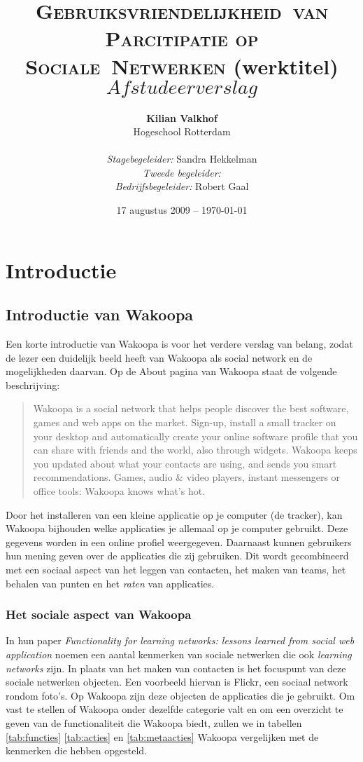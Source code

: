 \documentclass[a4paper, 10pt, pdftex]{article}
\title{\textsc{Gebruiksvriendelijkheid~van Parcitipatie op Sociale~Netwerken} \linebreak (werktitel) \linebreak $Afstudeerverslag$}
\author{\textbf{Kilian Valkhof}\\
  Hogeschool Rotterdam\\
  \\
  \textit{Stagebegeleider:} Sandra Hekkelman\\
  \textit{Tweede begeleider:}\\
  \textit{Bedrijfsbegeleider:} Robert Gaal}
\date{17 augustus 2009 -- \today}
\begin{document}
  \normalem
  \maketitle

  \newpage
  \tableofcontents

  \newpage
  \section{Introductie}
    \subsection{Introductie van Wakoopa}
      Een korte introductie van Wakoopa is voor het verdere verslag van belang, zodat de lezer een duidelijk beeld heeft van Wakoopa als social network en de mogelijkheden daarvan. Op de About pagina van Wakoopa \citep{Gaal2007} staat de volgende beschrijving:
        \begin{quote} Wakoopa is a social network that helps people discover the best software, games and web apps on the market. Sign-up, install a small tracker on your desktop and automatically create your online software profile that you can share with friends and the world, also through widgets. Wakoopa keeps you updated about what your contacts are using, and sends you smart recommendations. Games, audio \& video players, instant messengers or office tools: Wakoopa knows what's hot.
        \end{quote}
      Door het installeren van een kleine applicatie op je computer (de tracker), kan Wakoopa bijhouden welke applicaties je allemaal op je computer gebruikt. Deze gegevens worden in een online profiel weergegeven. Daarnaast kunnen gebruikers hun mening geven over de applicaties die zij gebruiken. Dit wordt gecombineerd met een sociaal aspect van het leggen van contacten, het maken van teams, het behalen van punten en het \emph{raten} van applicaties.

        \subsubsection{Het sociale aspect van Wakoopa}
        In hun paper \emph{Functionality for learning networks: lessons learned from social web application} noemen \citeauthor{Berlanga2007} een aantal kenmerken van sociale netwerken die ook \emph{learning networks} zijn. In plaats van het maken van contacten is het focuspunt van deze sociale netwerken objecten. Een voorbeeld hiervan is Flickr, een sociaal network rondom foto's. Op Wakoopa zijn deze objecten de applicaties die je gebruikt. Om vast te stellen of Wakoopa onder dezelfde categorie valt en om een overzicht te geven van de functionaliteit die Wakoopa biedt, zullen we in tabellen \ref{tab:functies} \ref{tab:acties} en \ref{tab:metaacties} \label{learningnetwork} Wakoopa vergelijken met de kenmerken die \citeauthor{Berlanga2007} hebben opgesteld.
\end{document}
